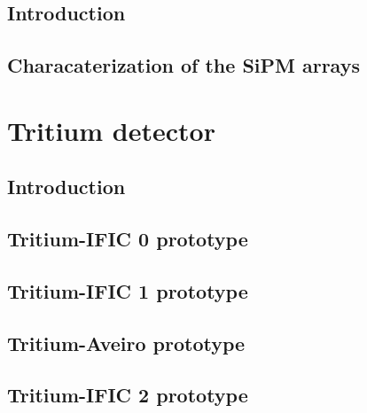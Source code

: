 \documentclass[12pt,a4paper]{book}
\begin{document}
		\subsection{Introduction}
		\newpage
		
		\subsection{Characaterization of the SiPM arrays}
		\newpage
		
	\section{Tritium detector}
		\subsection{Introduction}
		\newpage
		
		\subsection{Tritium-IFIC 0 prototype}
		\newpage
		
		\subsection{Tritium-IFIC 1 prototype}
		\newpage
		
		\subsection{Tritium-Aveiro prototype}
		\newpage
		
		\subsection{Tritium-IFIC 2 prototype}
		\newpage
		
\end{document}
